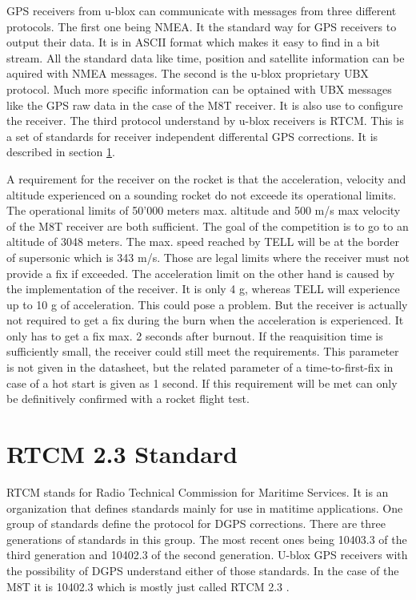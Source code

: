 GPS receivers from u-blox can communicate with messages from three different protocols.
The first one being NMEA.
It the standard way for GPS receivers to output their data.
It is in ASCII format which makes it easy to find in a bit stream.
All the standard data like time, position and satellite information can be aquired with NMEA messages.
The second is the u-blox proprietary UBX protocol.
Much more specific information can be optained with UBX messages like the GPS raw data in the case of the M8T receiver.
It is also use to configure the receiver.
The third protocol understand by u-blox receivers is RTCM.
This is a set of standards for receiver independent differental GPS corrections.
It is described in section \ref{sec:rtcm}.

A requirement for the receiver on the rocket is that the acceleration, velocity and altitude experienced on a sounding rocket do not exceede its operational limits.
The operational limits of 50'000 meters max. altitude and 500 m/s max velocity of the M8T receiver are both sufficient.
The goal of the competition is to go to an altitude of 3048 meters.
The max. speed reached by TELL will be at the border of supersonic which is 343 m/s.
Those are legal limits where the receiver must not provide a fix if exceeded.
The acceleration limit on the other hand is caused by the implementation of the receiver.
It is only 4 g, whereas TELL will experience up to 10 g of acceleration.
This could pose a problem.
But the receiver is actually not required to get a fix during the burn when the acceleration is experienced.
It only has to get a fix max. 2 seconds after burnout.
If the reaquisition time is sufficiently small, the receiver could still meet the requirements.
This parameter is not given in the datasheet, but the related parameter of a time-to-first-fix in case of a hot start is given as 1 second.
If this requirement will be met can only be definitively confirmed with a rocket flight test. \cite{M8T}

\section{RTCM 2.3 Standard}\label{sec:rtcm}

RTCM stands for Radio Technical Commission for Maritime Services.
It is an organization that defines standards mainly for use in matitime applications.
One group of standards define the protocol for DGPS corrections.
There are three generations of standards in this group.
The most recent ones being 10403.3 of the third generation and 10402.3 of the second generation.
U-blox GPS receivers with the possibility of DGPS understand either of those standards.
In the case of the M8T it is 10402.3 which is mostly just called RTCM 2.3 \cite{RTCM_2.3}.

